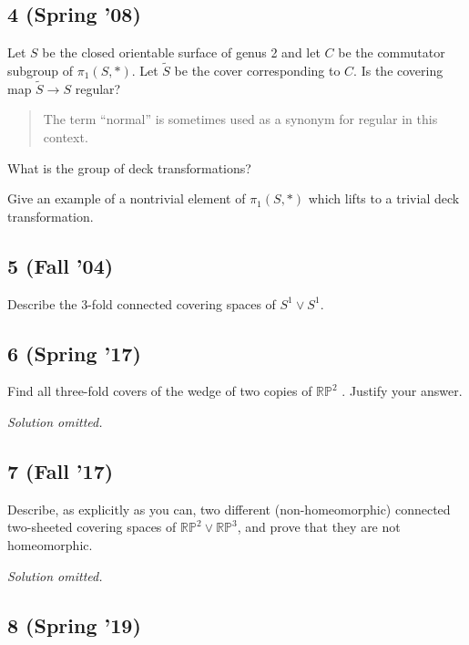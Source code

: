 \hypertarget{spring-08-2}{%
\subsection{4 (Spring '08)}\label{spring-08-2}}

Let \(S\) be the closed orientable surface of genus 2 and let \(C\) be
the commutator subgroup of \(\pi_1 (S, \ast)\). Let \(\tilde S\) be the
cover corresponding to \(C\). Is the covering map \(\tilde S \to S\)
regular?

\begin{quote}
The term ``normal'' is sometimes used as a synonym for regular in this
context.
\end{quote}

What is the group of deck transformations?

Give an example of a nontrivial element of \(\pi_1 (S, \ast)\) which
lifts to a trivial deck transformation.

\hypertarget{fall-04-2}{%
\subsection{5 (Fall '04)}\label{fall-04-2}}

Describe the 3-fold connected covering spaces of \(S^1 \lor S^1\).

\hypertarget{spring-17}{%
\subsection{6 (Spring '17)}\label{spring-17}}

Find all three-fold covers of the wedge of two copies of
\({\mathbb{RP}}^2\) . Justify your answer.

\emph{Solution omitted.}

\hypertarget{fall-17-2}{%
\subsection{7 (Fall '17)}\label{fall-17-2}}

Describe, as explicitly as you can, two different (non-homeomorphic)
connected two-sheeted covering spaces of
\({\mathbb{RP}}^2 \lor {\mathbb{RP}}^3\), and prove that they are not
homeomorphic.


\emph{Solution omitted.}

\hypertarget{spring-19}{%
\subsection{8 (Spring '19)}\label{spring-19}}

